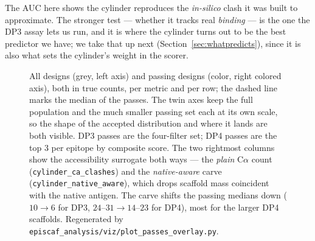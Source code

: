 The AUC here shows the cylinder reproduces the \emph{in-silico} clash it was built to
approximate. The stronger test --- whether it tracks real \emph{binding} --- is the one the DP3
assay lets us run, and it is where the cylinder turns out to be the best predictor we have; we
take that up next (Section~\ref{sec:whatpredicts}), since it is also what sets the cylinder's
weight in the scorer.

\begin{figure}[h]\centering
{}
\caption{All designs (grey, left axis) and passing designs (color, right colored axis), both
in true counts, per metric and per row; the dashed line marks the median of the passes. The
twin axes keep the full population and the much smaller passing set each at its own scale, so
the shape of the accepted distribution and where it lands are both visible. DP3 passes are
the four-filter set; DP4 passes are the top 3 per epitope by composite score. The two
rightmost columns show the accessibility surrogate both ways --- the \emph{plain} C$\alpha$
count (\texttt{cylinder\_ca\_clashes}) and the \emph{native-aware} carve
(\texttt{cylinder\_native\_aware}), which drops scaffold mass coincident with the native
antigen. The carve shifts the passing medians down ($10\!\to\!6$ for DP3,
$24\text{--}31\!\to\!14\text{--}23$ for DP4), most for the larger DP4 scaffolds. Regenerated by
\texttt{episcaf\_analysis/viz/plot\_passes\_overlay.py}.}
\label{fig:overlay}
\end{figure}

